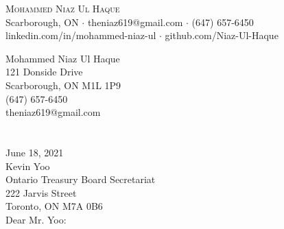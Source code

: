 \documentclass[a4paper]{article}
\begin{document}
\vspace*{-40pt}

    

\vspace*{-10pt}
\begin{center}
	{\Huge \scshape {Mohammed Niaz Ul Haque}}\\
	Scarborough, ON $\cdot$ theniaz619@gmail.com $\cdot$ (647) 657-6450\\
	linkedin.com/in/mohammed-niaz-ul $\cdot$ github.com/Niaz-Ul-Haque\\
\end{center}
\vspace*{10mm}

\vspace*{2mm}

Mohammed Niaz Ul Haque\\
121 Donside Drive\\
Scarborough, ON M1L 1P9\\
(647) 657-6450\\
theniaz619@gmail.com\linebreak\\\\

\\June 18, 2021\linebreak\\

Kevin Yoo\\
Ontario Treasury Board Secretariat\\
222 Jarvis Street\\
Toronto, ON M7A 0B6\linebreak\\
\linebreak
Dear Mr. Yoo:\linebreak\\
\end{document}

